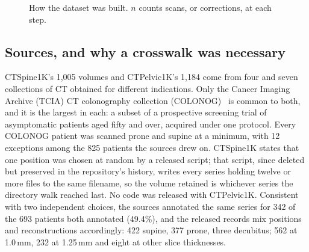 \documentclass[aapm,mph,amsmath,amssymb,preprint,linenumbers]{revtex4-2}
\begin{document}
\begin{figure}[t]
\caption{How the dataset was built. $n$ counts scans, or corrections, at each step.}
\label{fig:pipeline}
\end{figure}

\subsection{Sources, and why a crosswalk was necessary}\label{sec:sources}
CTSpine1K's 1{,}005 volumes and CTPelvic1K's 1{,}184 come from four and seven collections of
CT obtained for different indications. Only the Cancer Imaging Archive (TCIA) CT colonography
collection (COLONOG)~\cite{colonog,tcia} is common to both, and it is the largest in each: a
subset of a prospective screening trial of asymptomatic patients aged fifty and over, acquired
under one protocol. Every COLONOG patient was scanned prone and supine at a minimum, with 12
exceptions among the 825 patients the sources drew on. CTSpine1K states that one position was
chosen at random by a released script; that script, since deleted but preserved in the
repository's history, writes every series holding twelve or more files to the same filename,
so the volume retained is whichever series the directory walk reached last. No code was
released with CTPelvic1K. Consistent with two independent choices, the sources annotated the
same series for 342 of the 693 patients both annotated (49.4\%), and the released records mix
positions and reconstructions accordingly: 422 supine, 377 prone, three decubitus; 562 at
1.0\,mm, 232 at 1.25\,mm and eight at other slice thicknesses.
\end{document}
